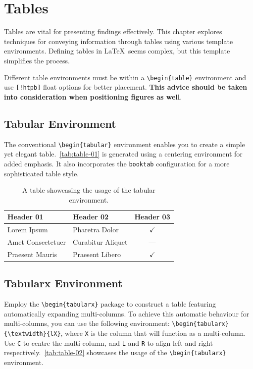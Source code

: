 \section{Tables}
Tables are vital for presenting findings effectively. This chapter explores techniques for conveying information through tables using various template environments. Defining tables in \LaTeX\ seems complex, but this template simplifies the process.

\begin{block}[tip]
    Different table environments must be within a \texttt{\textbackslash begin\{table\}} environment and use \texttt{[!htpb]} float options for better placement. \textbf{This advice should be taken into consideration when positioning figures as well}.
\end{block}

\subsection{Tabular Environment}
The conventional \verb|\begin{tabular}| environment enables you to create a simple yet elegant table.\ \autoref{tab:table-01} is generated using a centering environment for added emphasis. It also incorporates the \verb|booktab| configuration for a more sophisticated table style.

\begin{table}[!htpb]
    \caption{A table showcasing the usage of the tabular environment.}
    \label{tab:table-01}
    \centering
    \begin{tabular}{llc}
        \toprule
        \textbf{Header 01} & \textbf{Header 02} & \textbf{Header 03} \\
        \midrule
        Lorem Ipsum        & Pharetra Dolor     & \(\checkmark\)     \\
        Amet Consectetuer  & Curabitur Aliquet  & ---                \\
        Praesent Mauris    & Praesent Libero    & \(\checkmark\)     \\
        \bottomrule
    \end{tabular}
\end{table}

\subsection{Tabularx Environment}
Employ the \verb|\begin{tabularx}| package to construct a table featuring automatically expanding multi-columns. To achieve this automatic behaviour for multi-columns, you can use the following environment: \verb|\begin{tabularx}{\textwidth}{lX}|, where \verb|X| is the column that will function as a multi-column. Use \verb|C| to centre the multi-column, and \verb|L| and \verb|R| to align left and right respectively.\ \autoref{tab:table-02} showcases the usage of the \verb|\begin{tabularx}| environment.

